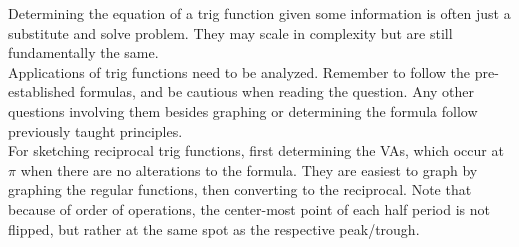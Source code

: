 \documentclass{article}
\begin{document}
Determining the equation of a trig function given some information is often just a substitute and solve problem. They may scale in complexity but are still fundamentally the same. \\

Applications of trig functions need to be analyzed. Remember to follow the pre-established formulas, and be cautious when reading the question. Any other questions involving them besides graphing or determining the formula follow previously taught principles. \\

For sketching reciprocal trig functions, first determining the VAs, which occur at $\pi$ when there are no alterations to the formula. They are easiest to graph by graphing the regular functions, then converting to the reciprocal. Note that because of order of operations, the center-most point of each half period is not flipped, but rather at the same spot as the respective peak/trough.
\end{document}
